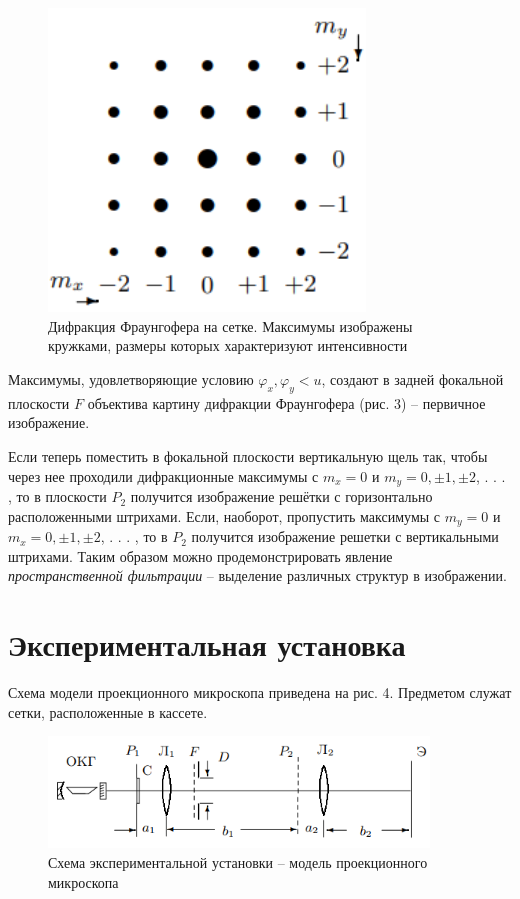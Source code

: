\documentclass[a4paper,12pt]{article}
\begin{document}
\begin{figure}\label{fig: Fraunhofer diffraction intensity 2D}
    \begin{center}
    \vspace{-20pt}
         \includegraphics[width = 0.75\textwidth]{Fraunhofer diffraction intensity 2D.png}
    \end{center}
    \caption{Дифракция Фраунгофера на сетке. Максимумы изображены кружками, размеры которых характеризуют интенсивности}
\end{figure}
Максимумы, удовлетворяющие условию $\varphi_x, \varphi_y < u$, создают в задней
фокальной плоскости $F$ объектива картину дифракции Фраунгофера (рис. 3) -- первичное изображение.

Если теперь поместить в фокальной плоскости вертикальную щель так, чтобы через нее проходили дифракционные максимумы с $m_x = 0$ и $m_y = 0, \pm 1, \pm 2$, . . . , то в плоскости $P_2$ получится изображение решётки с горизонтально расположенными штрихами. Если, наоборот, пропустить максимумы с $m_y = 0$ и $m_x = 0, \pm 1,\pm 2$, . . . , то в $P_2$ получится изображение решетки с вертикальными штрихами. Таким образом можно продемонстрировать явление \textit{пространственной фильтрации} -- выделение различных структур в изображении.

\section{Экспериментальная установка}
Схема модели проекционного микроскопа приведена на рис. 4. Предметом служат сетки, расположенные в кассете.
\begin{figure}[H]\label{fig: Experimental setup}
    \centering
    \includegraphics[width = 0.9\textwidth]{Experimental setup.png}
    \caption{Схема экспериментальной установки -- модель проекционного микроскопа}
\end{figure}
\end{document}
